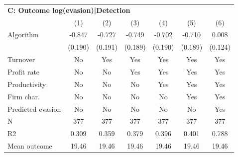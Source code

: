 \begin{tabular}{lcccccc}
\midrule \multicolumn{7}{l}{\textbf{C: Outcome log(evasion)|Detection}} \\ \multicolumn{1}{l}{} & (1) & (2) & (3) & (4) & (5) & (6) \\ \midrule
Algorithm   &      -0.847\sym{***}&      -0.727\sym{***}&      -0.749\sym{***}&      -0.702\sym{***}&      -0.710\sym{***}&       0.008         \\
            &     (0.190)         &     (0.191)         &     (0.189)         &     (0.190)         &     (0.189)         &     (0.124)         \\
\midrule
Turnover    &          No         &         Yes         &         Yes         &         Yes         &         Yes         &         Yes         \\
Profit rate &          No         &          No         &         Yes         &         Yes         &         Yes         &         Yes         \\
Productivity&          No         &          No         &          No         &         Yes         &         Yes         &         Yes         \\
Firm char.  &          No         &          No         &          No         &          No         &         Yes         &         Yes         \\
Predicted evasion&          No         &          No         &          No         &          No         &          No         &         Yes         \\
N           &         377         &         377         &         377         &         377         &         377         &         377         \\
R2          &       0.309         &       0.359         &       0.379         &       0.396         &       0.401         &       0.788         \\
Mean outcome&       19.46         &       19.46         &       19.46         &       19.46         &       19.46         &       19.46         \\
\bottomrule \end{tabular}
